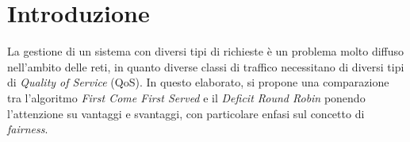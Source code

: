 \chapter*{Introduzione}


La gestione di un sistema con diversi tipi di richieste è un problema molto diffuso nell'ambito delle reti, in quanto diverse classi di traffico necessitano di diversi tipi di \textit{Quality of Service} (QoS). In questo elaborato, si propone una comparazione tra l'algoritmo \textit{First Come First Served} e il \textit{Deficit Round Robin} ponendo l'attenzione su vantaggi e svantaggi, con particolare enfasi sul concetto di \textit{fairness}.
